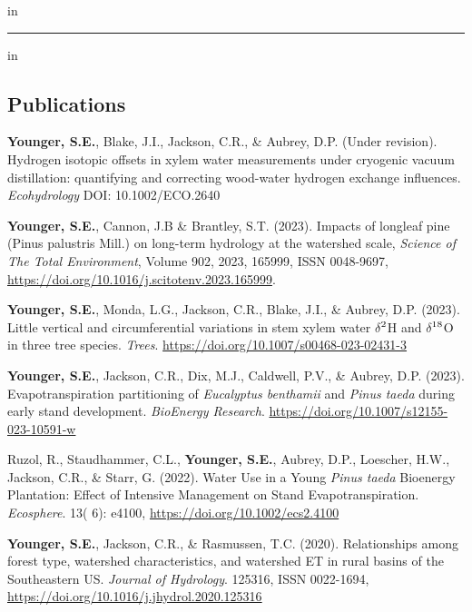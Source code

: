 \documentclass[10pt,letterpaper]{article}
\begin{document}
	\vspace{-0.4em}
	 in
	
	\hrule
	\vspace{-0.4em}
	 in
	\subsection*{Publications}
	
	\begin{hangparas}{.25in}{1}
		
		\textbf{Younger, S.E.}, Blake, J.I., Jackson, C.R., \& Aubrey, D.P. (Under revision). Hydrogen isotopic offsets in xylem water measurements under cryogenic vacuum distillation: quantifying and correcting wood-water hydrogen exchange influences. \textit{Ecohydrology} DOI: 10.1002/ECO.2640
		
		\textbf{Younger, S.E.}, Cannon, J.B \& Brantley, S.T. (2023). Impacts of longleaf pine (Pinus palustris Mill.) on long-term hydrology at the watershed scale, \textit{Science of The Total Environment}, Volume 902, 2023, 165999, ISSN 0048-9697, \url{https://doi.org/10.1016/j.scitotenv.2023.165999}.
		
		\textbf{Younger, S.E.}, Monda, L.G., Jackson, C.R., Blake, J.I., \& Aubrey, D.P. (2023). Little vertical and circumferential variations in stem xylem water $\delta$$\textsuperscript{2}$H and $\delta$$\textsuperscript{18}$O in three tree species. \textit{Trees}. \newline \url{https://doi.org/10.1007/s00468-023-02431-3}
		
		\textbf{Younger, S.E.}, Jackson, C.R., Dix, M.J., Caldwell, P.V., \& Aubrey, D.P. (2023). Evapotranspiration partitioning of \textit{Eucalyptus benthamii} and \textit{Pinus taeda} during early stand development. \textit{BioEnergy Research}. \url{https://doi.org/10.1007/s12155-023-10591-w}
		
		Ruzol, R., Staudhammer, C.L., \textbf{Younger, S.E.}, Aubrey, D.P., Loescher, H.W., Jackson, C.R., \& Starr, G. (2022). Water Use in a Young \textit{Pinus taeda} Bioenergy Plantation: Effect of Intensive Management on Stand Evapotranspiration. \textit{Ecosphere}. 13( 6): e4100, \url{https://doi.org/10.1002/ecs2.4100}
		
		\textbf{Younger, S.E.}, Jackson, C.R., \& Rasmussen, T.C. (2020). Relationships among forest type, watershed characteristics, and watershed ET in rural basins of the Southeastern US.
		\textit{Journal of Hydrology}. 125316, ISSN 0022-1694, \url{https://doi.org/10.1016/j.jhydrol.2020.125316}
		

\end{hangparas}
\end{document}
